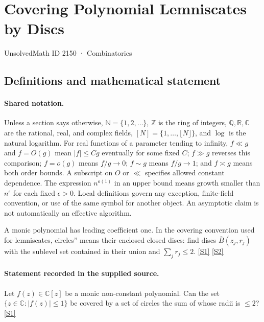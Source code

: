 \documentclass[11pt,a4paper]{article}
\newcommand{\N}{\mathbb{N}}
\newcommand{\Z}{\mathbb{Z}}
\newcommand{\Q}{\mathbb{Q}}
\newcommand{\R}{\mathbb{R}}
\newcommand{\C}{\mathbb{C}}
\newcommand{\sref}[2]{\hyperlink{source:#1:#2}{[S#2]}}
\begin{document}

\setcounter{section}{2149}

\section{Covering Polynomial Lemniscates by Discs}\label{2150}

{\small\sffamily UnsolvedMath ID 2150 · Combinatorics}

\subsection{Definitions and mathematical statement}

\paragraph{Shared notation.}Unless a section says otherwise, $\N=\{1,2,\ldots\}$,
$\Z$ is the ring of integers, $\Q,\R,\C$ are the rational, real, and complex
fields, $[N]=\{1,\ldots,\lfloor N\rfloor\}$, and $\log$ is the natural
logarithm. For real functions of a parameter tending to infinity,
$f\ll g$ and $f=O(g)$ mean $|f|\leq Cg$ eventually for some fixed $C$;
$f\gg g$ reverses this comparison; $f=o(g)$ means $f/g\to0$;
$f\sim g$ means $f/g\to1$; and $f\asymp g$ means both order bounds.
A subscript on $O$ or $\ll$ specifies allowed constant dependence.
The expression $n^{o(1)}$ in an upper bound means growth smaller than
$n^\epsilon$ for each fixed $\epsilon>0$. Local definitions govern any
exception, finite-field convention, or use of the same symbol for another
object. An asymptotic claim is not automatically an effective algorithm.



A monic polynomial has leading coefficient one. In the covering convention used for lemniscates, circles'' means their enclosed closed discs: find discs $\overline B(z_j,r_j)$ with the sublevel set contained in their union and $\sum_jr_j\leq2$. \sref{2150}{1} \sref{2150}{2}

\paragraph{Statement recorded in the supplied source.}
Let $f(z)\in\mathbb{C}[z]$ be a monic non-constant polynomial. Can the set $ \{ z\in \mathbb{C} : \lvert f(z)\rvert \leq 1\} $ be covered by a set of circles the sum of whose radii is $\leq 2$? \sref{2150}{1}
\end{document}
